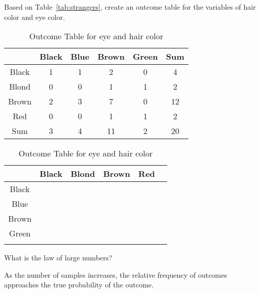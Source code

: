 \documentclass[11pt]{exam}
\begin{document}
\begin{questions}

    \question[8] Based on Table~\ref{tab:strangers}, create an outcome table
    for the variables of hair color and eye color.
\ifprintanswers
\begin{table}[ht]
\begin{center}
\begin{tabular}{|c|c|c|c|c||c|}
  \hline
 & Black & Blue & Brown & Green & Sum \\ 
  \hline
Black & 1 & 1 & 2 & 0 & 4 \\ 
   \hline
Blond & 0 & 0 & 1 & 1 & 2 \\ 
   \hline
Brown & 2 & 3 & 7 & 0 & 12 \\ 
   \hline
Red & 0 & 0 & 1 & 1 & 2 \\ 
   \hline
\hline
Sum & 3 & 4 & 11 & 2 & 20 \\ 
   \hline
\end{tabular}
\caption{Outcome Table for eye and hair color}
\label{tab:outcome1}
\end{center}
\end{table}\else
%
\begin{table}[ht]
\begin{center}
\begin{tabular}{|c|c|c|c|c||p{1cm}|}
  \hline
 & Black & Blond & Brown & Red &   \\ 
  \hline
Black &   &   &   &   &   \\ 
   \hline
Blue &   &   &   &   &   \\ 
   \hline
Brown &   &   &   &   &   \\ 
   \hline
Green &   &   &   &   &   \\ 
   \hline
\hline
  &   &   &   &   &   \\ 
   \hline
\end{tabular}
\caption{Outcome Table for eye and hair color}
\label{tab:outcome1}
\end{center}
\end{table}\fi
\newpage
    \question[3] What is the law of large numbers?
    \begin{solutionordottedlines}[0.6in]
      As the number of samples increases, the relative frequency of
      outcomes approaches the true probability of the outcome.
    \end{solutionordottedlines}


\end{questions}
\end{document}
